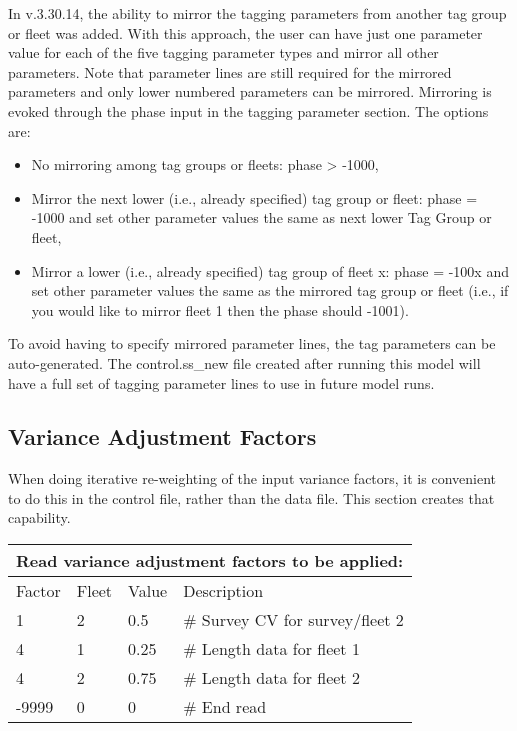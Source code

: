 In v.3.30.14, the ability to mirror the tagging parameters from another tag group or fleet was added. With this approach, the user can have just one parameter value for each of the five tagging parameter types and mirror all other parameters. Note that parameter lines are still required for the mirrored parameters and only lower numbered parameters can be mirrored. Mirroring is evoked through the phase input in the tagging parameter section. The options are:
\begin{itemize}
	\item No mirroring among tag groups or fleets: phase > -1000,
	\item Mirror the next lower (i.e., already specified) tag group or fleet: phase = -1000 and set other parameter values the same as next lower Tag Group or fleet,
	\item Mirror a lower (i.e., already specified) tag group of fleet x: phase = -100x and set other parameter values the same as the mirrored tag group or fleet (i.e., if you would like to mirror fleet 1 then the phase should -1001).
\end{itemize}

To avoid having to specify mirrored parameter lines, the tag parameters can be auto-generated. The control.ss\_new file created after running this model will have a full set of tagging parameter lines to use in future model runs.

\hypertarget{GcompVar}{}
\subsection{Variance Adjustment Factors}
When doing iterative re-weighting of the input variance factors, it is convenient to do this in the control file, rather than the data file. This section creates that capability.

\begin{longtable}{p{3cm} p{3cm} p{2.5cm} p{6.25cm}}

	\multicolumn{4}{l}{Read variance adjustment factors to be applied:} \\
	\hline
	Factor & Fleet & Value & Description \Tstrut\Bstrut\\
	\hline
	1 & 2 & 0.5 & \# Survey CV for survey/fleet 2 \Tstrut\\
	4 & 1 & 0.25 & \# Length data for fleet 1 \\
	4 & 2 & 0.75 & \# Length data for fleet 2 \\
	-9999 & 0 & 0 & \# End read \Bstrut\\
	\hline
\end{longtable}



